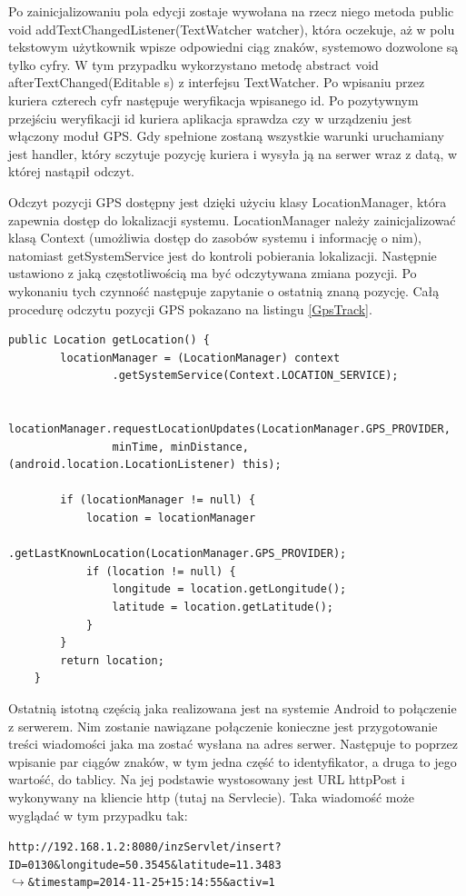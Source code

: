 \documentclass[eng,printmode,oneside]{mgr}
\begin{document}
Po zainicjalizowaniu pola edycji zostaje wywołana na rzecz niego metoda public
void addTextChangedListener(TextWatcher watcher), która oczekuje, aż w polu
tekstowym użytkownik wpisze odpowiedni ciąg znaków, systemowo dozwolone są
tylko cyfry.
W tym przypadku wykorzystano metodę abstract void afterTextChanged(Editable s) z interfejsu
TextWatcher. Po wpisaniu przez kuriera czterech cyfr następuje weryfikacja
wpisanego id. Po pozytywnym przejściu weryfikacji id kuriera aplikacja sprawdza
czy w urządzeniu jest włączony moduł GPS. Gdy spełnione zostaną wszystkie
warunki uruchamiany jest handler, który sczytuje pozycję kuriera i wysyła ją na
serwer wraz z datą, w której nastąpił odczyt. 

Odczyt pozycji GPS dostępny jest dzięki użyciu klasy LocationManager, która
zapewnia dostęp do lokalizacji systemu. LocationManager należy zainicjalizować
klasą Context (umożliwia dostęp do zasobów systemu i informację o nim),
natomiast getSystemService jest do kontroli pobierania lokalizacji. Następnie
ustawiono z jaką częstotliwością ma być odczytywana zmiana pozycji. Po wykonaniu
tych czynność następuje zapytanie o ostatnią znaną pozycję. Całą
procedurę odczytu pozycji GPS pokazano na listingu \ref{GpsTrack}.

\begin{lstlisting}[caption=Pobieranie lokalizacji,label=GpsTrack]
public Location getLocation() {
		locationManager = (LocationManager) context
				.getSystemService(Context.LOCATION_SERVICE);

		locationManager.requestLocationUpdates(LocationManager.GPS_PROVIDER,
				minTime, minDistance, (android.location.LocationListener) this);

		if (locationManager != null) {
			location = locationManager
					.getLastKnownLocation(LocationManager.GPS_PROVIDER);
			if (location != null) {
				longitude = location.getLongitude();
				latitude = location.getLatitude();
			}
		}
		return location;
	}
\end{lstlisting}

Ostatnią istotną częścią jaka realizowana jest na systemie Android to połączenie
z serwerem. Nim zostanie nawiązane połączenie konieczne jest przygotowanie
treści wiadomości jaka ma zostać wysłana na adres serwer. Następuje to poprzez
wpisanie par ciągów znaków, w tym jedna część to identyfikator, a druga to jego
wartość, do tablicy. Na jej podstawie wystosowany jest URL httpPost i wykonywany
na kliencie http (tutaj na Servlecie). Taka wiadomość może wyglądać w tym
przypadku tak:
\begin{flushright}
\texttt{http://192.168.1.2:8080/inzServlet/insert?ID=0130\&longitude=50.3545\&latitude=11.3483
\\$\hookrightarrow$\&timestamp=2014-11-25+15:14:55\&activ=1}
\end{flushright}
\end{document}

